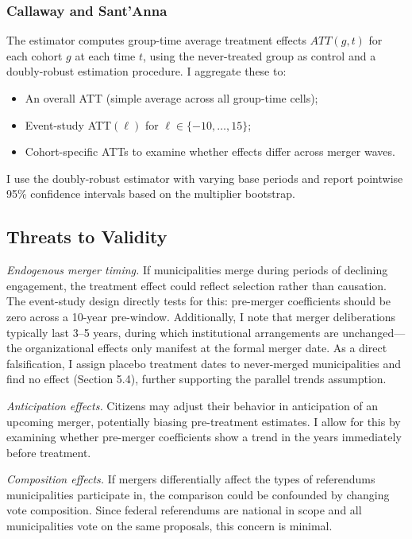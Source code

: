 \documentclass[12pt]{article}
\begin{document}
\subsubsection{Callaway and Sant'Anna}

The \citet{callaway2021difference} estimator computes group-time average treatment effects $ATT(g,t)$ for each cohort $g$ at each time $t$, using the never-treated group as control and a doubly-robust estimation procedure. I aggregate these to:
\begin{itemize}
    \item An overall ATT (simple average across all group-time cells);
    \item Event-study ATT$(\ell)$ for $\ell \in \{-10, \ldots, 15\}$;
    \item Cohort-specific ATTs to examine whether effects differ across merger waves.
\end{itemize}

I use the doubly-robust estimator with varying base periods and report pointwise 95\% confidence intervals based on the multiplier bootstrap.

\subsection{Threats to Validity}

\textit{Endogenous merger timing.} If municipalities merge during periods of declining engagement, the treatment effect could reflect selection rather than causation. The event-study design directly tests for this: pre-merger coefficients should be zero across a 10-year pre-window. Additionally, I note that merger deliberations typically last 3--5 years, during which institutional arrangements are unchanged---the organizational effects only manifest at the formal merger date. As a direct falsification, I assign placebo treatment dates to never-merged municipalities and find no effect (Section 5.4), further supporting the parallel trends assumption.

\textit{Anticipation effects.} Citizens may adjust their behavior in anticipation of an upcoming merger, potentially biasing pre-treatment estimates. I allow for this by examining whether pre-merger coefficients show a trend in the years immediately before treatment.

\textit{Composition effects.} If mergers differentially affect the types of referendums municipalities participate in, the comparison could be confounded by changing vote composition. Since federal referendums are national in scope and all municipalities vote on the same proposals, this concern is minimal.
\end{document}
